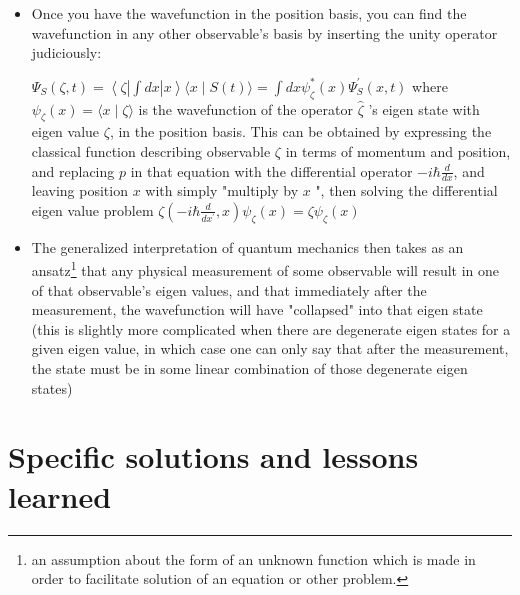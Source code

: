 \documentclass{article}
\begin{document}
\begin{itemize}
    \item Once you have the wavefunction in the position basis, you can find the wavefunction in any other observable's basis by inserting the unity operator judiciously:
    
$\Psi_{S}(\zeta, t)=\left\langle\zeta\left|\int d x\right| x\right\rangle\langle x \mid S(t)\rangle=\int d x \psi_{\zeta}^{*}(x) \Psi_{S}^{\prime}(x, t)$ where $\psi_{\zeta}(x)=\langle x \mid \zeta\rangle$ is the wavefunction of the operator $\hat{\zeta}$ 's eigen state with eigen value $\zeta$, in the position basis. This can be obtained by expressing the classical function describing observable $\zeta$ in terms of momentum and position, and replacing $p$ in that equation with the differential operator $-i \hbar \frac{d}{d x}$, and leaving position $x$ with simply "multiply by $x$ ", then solving the differential eigen value problem $\zeta\left(-i \hbar \frac{d}{d x^{\prime}}, x\right) \psi_{\zeta}(x)=\zeta \psi_{\zeta}(x)$

\item The generalized interpretation of quantum mechanics then takes as an ansatz\footnote{an assumption about the form of an unknown function which is made in order to facilitate solution of an equation or other problem.} that any physical measurement of some observable will result in one of that observable's eigen values, and that immediately after the measurement, the wavefunction will have "collapsed" into that eigen state (this is slightly more complicated when there are degenerate eigen states for a given eigen value, in which case one can only say that after the measurement, the state must be in some linear combination of those degenerate eigen states)
\end{itemize}

\section{Specific solutions and lessons learned}
\end{document}
